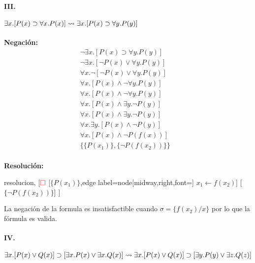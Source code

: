 \documentclass[10pt,a4paper]{article}
\begin{document}
\paragraph{III.} $\exists x. [P(x) \supset \forall x. P(x)] \underset{}{\overset{}{\leadsto}} \exists x. [P(x) \supset \forall y. P(y)]$
\begin{multicols}{2}
\textbf{Negación:}
\begin{align*}
\lnot\exists x. [P(x) \supset \forall y. P(y)] & \\[1pt]
\lnot\exists x. [\lnot P(x) \lor \forall y. P(y)] &\\[1pt]
\forall x. \lnot[\lnot P(x) \lor \forall y. P(y)] & \\[1pt]
\forall x. [P(x) \land \lnot\forall y. P(y)]  \\[1pt]
\forall x. [P(x) \land \lnot\forall y. P(y)]  \\[1pt]
\forall x. [P(x) \land \exists y. \lnot P(y)]  \\[1pt]
\forall x. [P(x) \land \exists y. \lnot P(y)]  \\[1pt]
\forall x.\exists y. [P(x) \land  \lnot P(y)]  \\[1pt]
\forall x.[P(x) \land  \lnot P(f(x))]\\[1pt]
\{\{P(x_1)\}, \{\lnot P(f(x_2))\}\}  \\[1pt]
\end{align*}

\textbf{Resolución:}
\begin{center}
	\begin{forest} resolucion,
[${\color{red}\Box}$ 
	[$\{P(x_1)\}$,edge label={node[midway,right,font=\footnotesize] {$x_1\leftarrow f(x_2)$}}]
    [$\{\lnot P(f(x_2))\}$]
]
	\end{forest}
\end{center}
La negación de la formula es insatisfactible cuando $\sigma = \{ f(x_2)/x\}$ por lo que la fórmula es valida.
\end{multicols}


\paragraph{IV.} $\exists x.[P(x) \lor Q(x)] \supset [\exists x.P(x) \lor \exists x.Q(x)] \underset{}{\overset{}{\leadsto}} \exists x.[P(x) \lor Q(x)] \supset [\exists y.P(y) \lor \exists z.Q(z)]$
\end{document}
